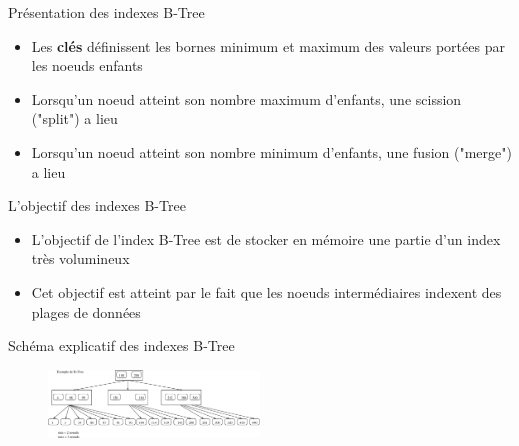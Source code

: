 
\begin{frame}[fragile]{Présentation des indexes B-Tree}

   \begin{itemize}
      \item Les \textbf{clés} définissent les bornes minimum et maximum des valeurs portées par les noeuds enfants
      \item Lorsqu'un noeud atteint son nombre maximum d'enfants, une scission ("split") a lieu
      \item Lorsqu'un noeud atteint son nombre minimum d'enfants, une fusion ("merge") a lieu

   \end{itemize}

\end{frame}


\begin{frame}[fragile]{L'objectif des indexes B-Tree}

   \begin{itemize}
      \item L'objectif de l'index B-Tree est de stocker en mémoire une partie d'un index très volumineux
      \item Cet objectif est atteint par le fait que les noeuds intermédiaires indexent des plages de données
   \end{itemize}

\end{frame}


\begin{frame}[fragile]{Schéma explicatif des indexes B-Tree}

\begin{figure}
\begin{center}
\includegraphics[angle=0, width=0.5\textwidth]{images/b_tree.eps}
\end{center}
\end{figure}

\end{frame}

